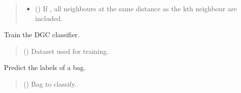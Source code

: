 \documentclass[letterpaper,10pt,english]{sphinxmanual}
\begin{document}
\begin{fulllineitems}
\begin{quote}
\begin{description}
\begin{itemize}
\item {} 
\sphinxAtStartPar
{} (\sphinxstyleliteralemphasis{\sphinxupquote{, }}) \textendash{} If , all neighbours at the same distance as the
kth neighbour are included.

\end{itemize}

\end{description}\end{quote}

\begin{fulllineitems}
\label{\detokenize{classifier/lazy/index:miml.classifier.miml.lazy.miml_dgc.MIMLDGC.build_internal}}
\pysigstartsignatures
\pysiglinewithargsret
{}
{}
{}
\pysigstopsignatures
\sphinxAtStartPar
Train the DGC classifier.
\begin{quote}\begin{description}
\sphinxAtStartPar
{} () \textendash{} Dataset used for training.

\end{description}\end{quote}

\end{fulllineitems}


\begin{fulllineitems}
\label{\detokenize{classifier/lazy/index:miml.classifier.miml.lazy.miml_dgc.MIMLDGC.make_prediction_internal}}
\pysigstartsignatures
\pysiglinewithargsret
{}
{}
{}
\pysigstopsignatures
\sphinxAtStartPar
Predict the labels of a bag.
\begin{quote}\begin{description}
\sphinxAtStartPar
{} ({\hyperref[\detokenize{data/_autosummary/miml.data.bag.Bag:miml.data.bag.Bag}]{}}) \textendash{} Bag to classify.


\end{description}
\end{quote}
\end{fulllineitems}
\end{fulllineitems}
\end{document}
